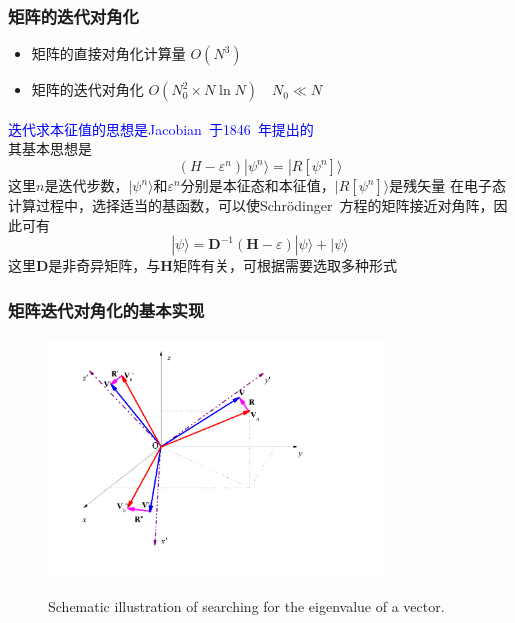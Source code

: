 \documentclass[cjk,slidestop,compress,mathserif,blue]{beamer}
\newcommand{\upcite}[1]{\hspace{0ex}\textsuperscript{\cite{#1}}} %
\begin{document}
\frame
{
	\frametitle{矩阵的迭代对角化}
	\begin{itemize}
		\item 矩阵的直接对角化计算量 $O(N^3)$
		\item 矩阵的迭代对角化 $O(N_0^2\times N\ln N)\quad N_0\ll N$
	\end{itemize}
	\textcolor{blue}{迭代求本征值的思想是\textrm{Jacobian~}于\textrm{1846~}年提出的}\upcite{Crelle30-51_1846}\\
	其基本思想是
	\begin{displaymath}
		(H-\varepsilon^n)|\psi^n\rangle=|R[\psi^n]\rangle
	\end{displaymath}
	这里$n$是迭代步数，$|\psi^n\rangle$和$\varepsilon^n$分别是本征态和本征值，$|R[\psi^n]\rangle$是残矢量
	\vskip 10pt
	在电子态计算过程中，选择适当的基函数，可以使\textrm{Schr\"odinger~}方程的矩阵接近对角阵，因此可有
	\begin{displaymath}
		|\psi\rangle=\mathbf{D}^{-1}(\mathbf{H}-\varepsilon)|\psi\rangle+|\psi\rangle
	\end{displaymath}
	这里$\mathbf{D}$是非奇异矩阵，与$\mathbf{H}$矩阵有关，可根据需要选取多种形式
}

\frame
{
	\frametitle{矩阵迭代对角化的基本实现}
\begin{figure}[h!]
\centering
\includegraphics[height=2.5in,width=3.5in,viewport=0 0 850 590,clip]{Figures/Coordinate_transformation.png}
\label{decent_CG}
\caption{\tiny \textrm{Schematic illustration of searching for the eigenvalue of a vector.}}%
\end{figure}
}
\end{document}
